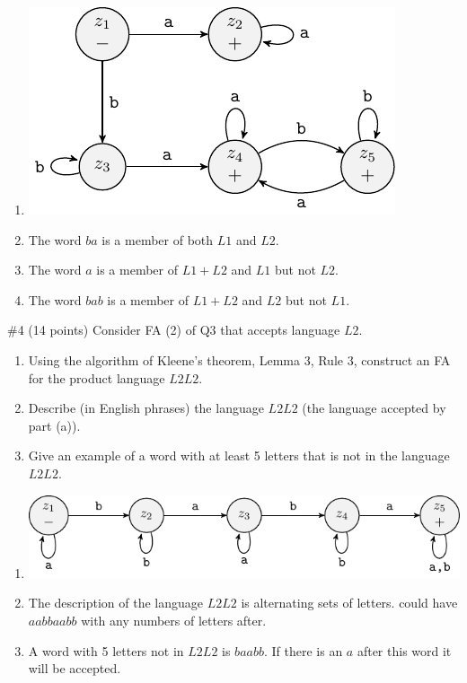 \begin{solution}
    \begin{enumerate}[label={\bf \alph*)}]
        \item \includegraphics[]{figures/answer/Answer3A.pdf}
        \item The word \(ba\) is a member of both \(L1\) and \(L2\).
        \item The word \(a\) is a member of \(L1+L2\) and \(L1\) but not \(L2\).
        \item The word \(bab\) is a member of \(L1+L2\) and  \(L2\) but not \(L1\).
    \end{enumerate}
\end{solution}

\begin{problem}{\#4 (14 points)}
    Consider FA (2) of Q3 that accepts language \(L2\).
    \begin{enumerate}[label={\bf \alph*)}]
        \item Using the algorithm of Kleene's theorem, Lemma 3, Rule 3, construct an FA for the product language \(L2L2\).
        \item Describe (in English phrases) the language \(L2L2\) (the language accepted by part (a)).
        \item Give an example of a word with at least 5 letters that is not in the language \(L2L2\).
    \end{enumerate}
\end{problem}
\vspace{2em}
\begin{solution}
    \begin{enumerate}[label={\bf \alph*)}]
        \item \includegraphics[]{figures/answer/Answer4A.pdf}
        \item The description of the language \(L2L2\) is alternating sets of letters.
        could have \(aabbaabb\) with any numbers of letters after.
        \item A word with 5 letters not in \(L2L2\) is \(baabb\).
        If there is an \(a\) after this word it will be accepted.
    \end{enumerate}
\end{solution}

